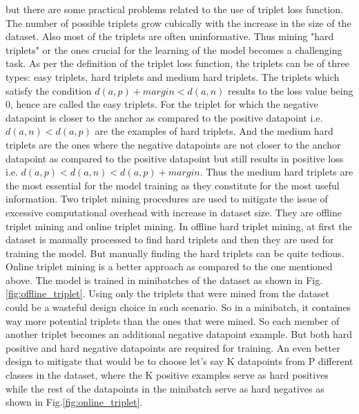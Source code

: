 but there are some practical problems related to the use of triplet loss function. The number of possible triplets grow cubically with the increase in the size of the dataset. Also most of the triplets are often uninformative. Thus mining "hard triplets" or the ones crucial for the learning of the model becomes a challenging task. As per the definition of the triplet loss function, the triplets can be of three types: easy triplets, hard triplets and medium hard triplets. The triplets which satisfy the condition $d(a,p)+margin<d(a,n)$ results to the loss value being 0, hence are called the easy triplets.\cite*{triplet_loss} For the triplet for which the negative datapoint is closer to the anchor as compared to the positive datapoint i.e. $d(a,n)<d(a,p)$ are the examples of hard triplets.\cite*{triplet_loss} And the medium hard triplets are the ones where the negative datapoints are not closer to the anchor datapoint as compared to the positive datapoint but still results in positive loss i.e. $d(a,p)<d(a,n)<d(a,p)+margin$.\cite*{triplet_loss} Thus the medium hard triplets are the most essential for the model training as they constitute for the most useful information. Two triplet mining procedures are used to mitigate the issue of excessive computational overhead with increase in dataset size. They are offline triplet mining and online triplet mining. In offline hard triplet mining, at first the dataset is manually processed to find hard triplets and then they are used for training the model. But manually finding the hard triplets can be quite tedious. Online triplet mining is a better approach as compared to the one mentioned above. The model is trained in minibatches of the dataset as shown in Fig.\ref*{fig:offline_triplet}. Using only the triplets that were mined from the dataset could be a wasteful design choice in such scenario. So in a minibatch, it containes way more potential triplets than the ones that were mined. So each member of another triplet becomes an additional negative datapoint example. But both hard positive and hard negative datapoints are required for training. An even better design to mitigate that would be to choose let's say K datapoints from P different classes in the dataset, where the K positive examples serve as hard positives while the rest of the datapoints in the minibatch serve as hard negatives as shown in Fig.\ref*{fig:online_triplet}\cite*{hermans2017defense}.

\vspace{5mm}

